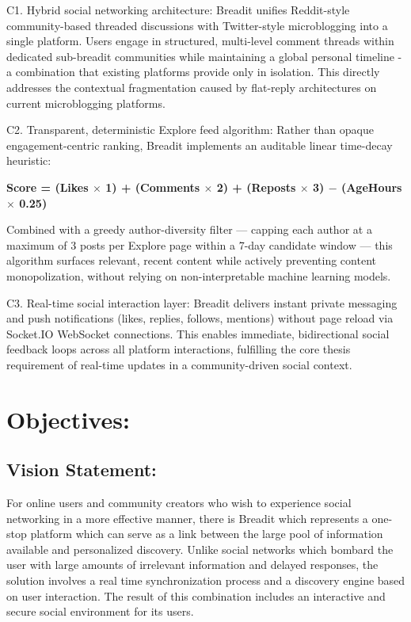 C1. Hybrid social networking architecture: Breadit unifies Reddit-style community-based threaded discussions with Twitter-style microblogging into a single platform. Users engage in structured, multi-level comment threads within dedicated sub-breadit communities while maintaining a global personal timeline - a combination that existing platforms provide only in isolation. This directly addresses the contextual fragmentation caused by flat-reply architectures on current microblogging platforms.

C2. Transparent, deterministic Explore feed algorithm: Rather than opaque engagement-centric ranking, Breadit implements an auditable linear time-decay heuristic:

    	\textbf{Score = (Likes $\times$ 1) + (Comments $\times$ 2) + (Reposts $\times$ 3) $-$ (}\textbf{AgeHours}\textbf{ $\times$ 0.25)}

Combined with a greedy author-diversity filter --- capping each author at a maximum of 3 posts per Explore page within a 7-day candidate window --- this algorithm surfaces relevant, recent content while actively preventing content monopolization, without relying on non-interpretable machine learning models.

C3. Real-time social interaction layer: Breadit delivers instant private messaging and push notifications (likes, replies, follows, mentions) without page reload via Socket.IO WebSocket connections. This enables immediate, bidirectional social feedback loops across all platform interactions, fulfilling the core thesis requirement of real-time updates in a community-driven social context.

\section{Objectives:}

\subsection{Vision Statement:}

For online users and community creators who wish to experience social networking in a more effective manner, there is Breadit which represents a one-stop platform which can serve as a link between the large pool of information available and personalized discovery. Unlike social networks which bombard the user with large amounts of irrelevant information and delayed responses, the solution involves a real time synchronization process and a discovery engine based on user interaction. The result of this combination includes an interactive and secure social environment for its users.

